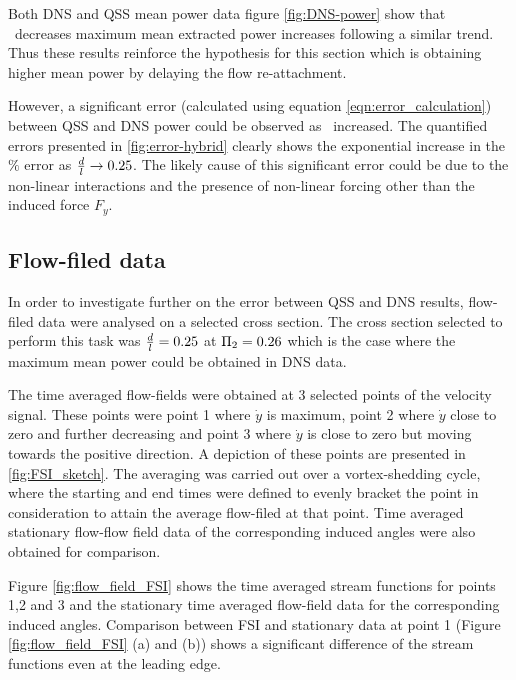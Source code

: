 Both  DNS and QSS mean power data figure \ref{fig:DNS-power} show that \ratio\ decreases maximum mean extracted power increases following a similar trend. Thus these results reinforce the hypothesis for this section which is obtaining higher mean power by delaying the flow re-attachment. 

However, a significant error (calculated using equation \ref{eqn:error_calculation}) between QSS and DNS power could be observed as \ratio\ increased. The quantified errors presented in \ref{fig:error-hybrid} clearly shows the exponential increase in the $\%$ error as $\frac{d}{l} \rightarrow 0.25$. The likely cause of this significant error could be due to the non-linear interactions and the presence of non-linear forcing other than the induced force $F_{y}$.



 
\subsection{Flow-filed data}
 
 In order to investigate further on the error between QSS and DNS results, flow-filed data were analysed on a selected cross section. The cross section selected to perform this task was $\frac{d}{l}=0.25$ at $\Pi_2=0.26$ which is the case where the maximum mean power could be obtained in DNS data. 
 


The time averaged flow-fields were obtained at 3 selected points of the velocity signal. These points were point 1 where $\dot{y}$ is maximum, point 2 where $\dot{y}$ close to zero and further decreasing and point 3 where $\dot{y}$ is close to zero but moving towards the positive direction. A depiction of these points are presented in \ref{fig:FSI_sketch}. The averaging was carried out over a vortex-shedding cycle, where the starting and end times were defined to evenly bracket the point in consideration to attain the average flow-filed at that point. Time averaged stationary flow-flow field data of the corresponding induced angles were also obtained for comparison.




Figure \ref{fig:flow_field_FSI} shows the time averaged stream functions for points 1,2 and 3 and the stationary time averaged flow-field data for the corresponding induced angles. Comparison between FSI and stationary data at point 1 (Figure \ref{fig:flow_field_FSI} (a) and (b)) shows a significant difference of the stream functions even at the leading edge.

